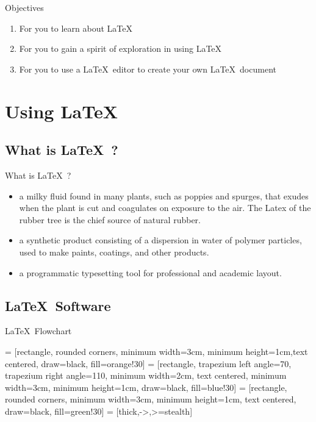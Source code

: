 \documentclass{beamer}
\begin{document}
\begin{frame}{Objectives}
	\begin{enumerate}
		\item For you to learn about \LaTeX\
		\item For you to gain a spirit of exploration in using \LaTeX
		\item For you to use a \LaTeX\ editor to create your own \LaTeX\ document
	\end{enumerate}
\end{frame}

\section{Using \LaTeX}

\subsection[What is \LaTeX\ ?]{What is \LaTeX\ ?}

\begin{frame}{What is \LaTeX\ ?}
	\begin{itemize}
		\item a milky fluid found in many plants, such as poppies and spurges, that exudes when the plant is cut and coagulates on exposure to the air. The Latex of the rubber tree is the chief source of natural rubber.
			\pause
		\item a synthetic product consisting of a dispersion in water of polymer particles, used to make paints, coatings, and other products.
			\pause
		\item a programmatic typesetting tool for professional and academic layout. 
	\end{itemize}	
\end{frame}

\subsection[\LaTeX\ Software]{\LaTeX\ Software}

\begin{frame}[fragile]{\LaTeX\ Flowchart}

 = [rectangle, rounded corners, minimum width=3cm, minimum height=1cm,text centered, draw=black, fill=orange!30]
\tikzstyle{io} = [rectangle, trapezium left angle=70, trapezium right angle=110, minimum width=2cm, text centered, minimum width=3cm, minimum height=1cm, draw=black, fill=blue!30]
\tikzstyle{output} = [rectangle, rounded corners, minimum width=3cm, minimum height=1cm, text centered, draw=black, fill=green!30]
\tikzstyle{arrow} = [thick,->,>=stealth]

\end{frame}
\end{document}
